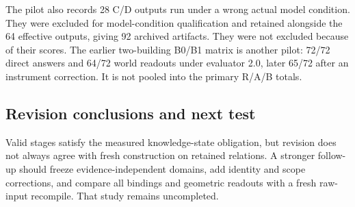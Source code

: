 The pilot also records 28 C/D outputs run under a wrong actual model condition. They were excluded for model-condition qualification and retained alongside the 64 effective outputs, giving 92 archived artifacts. They were not excluded because of their scores. The earlier two-building B0/B1 matrix is another pilot: 72/72 direct answers and 64/72 world readouts under evaluator 2.0, later 65/72 after an instrument correction. It is not pooled into the primary R/A/B totals.

\subsection{Revision conclusions and next test}
Valid stages satisfy the measured knowledge-state obligation, but revision does not always agree with fresh construction on retained relations. A stronger follow-up should freeze evidence-independent domains, add identity and scope corrections, and compare all bindings and geometric readouts with a fresh raw-input recompile. That study remains uncompleted.
